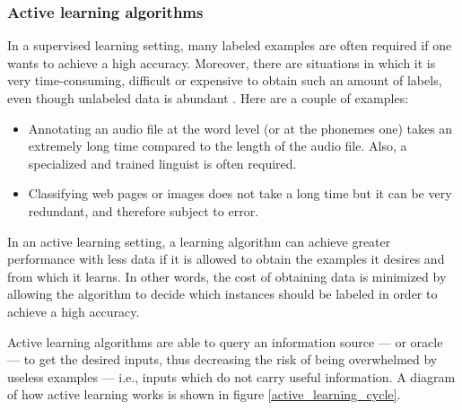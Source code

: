             \subsubsection{Active learning algorithms}\label{active_learning}
                In a supervised learning setting, many labeled examples are often required if one wants to achieve a high accuracy. Moreover, there are situations in which it is very time-consuming, difficult or expensive to obtain such an amount of labels, even though unlabeled data is abundant \cite[4]{Settles}. Here are a couple of examples:
                \begin{itemize}
                    \item Annotating an audio file at the word level (or at the phonemes one) takes an extremely long time compared to the length of the audio file. Also, a specialized and trained linguist is often required.
                    \item Classifying web pages or images does not take a long time but it can be very redundant, and therefore subject to error.
                \end{itemize}
                
                In an active learning setting, a learning algorithm can achieve greater performance with less data if it is allowed to obtain the examples it desires and from which it learns. In other words, the cost of obtaining data is minimized by allowing the algorithm to decide which instances should be labeled in order to achieve a high accuracy.
                
                Active learning algorithms are able to query an information source --- or oracle --- to get the desired inputs, thus decreasing the risk of being overwhelmed by useless examples --- i.e., inputs which do not carry useful information. A diagram of how active learning works is shown in figure \ref{active_learning_cycle}.
                
                
                
